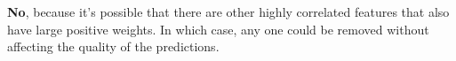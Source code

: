 {\bf No}, because it's possible that there are other highly correlated features that also have large positive weights. In which case, any one could be removed without affecting the quality of the predictions. 
